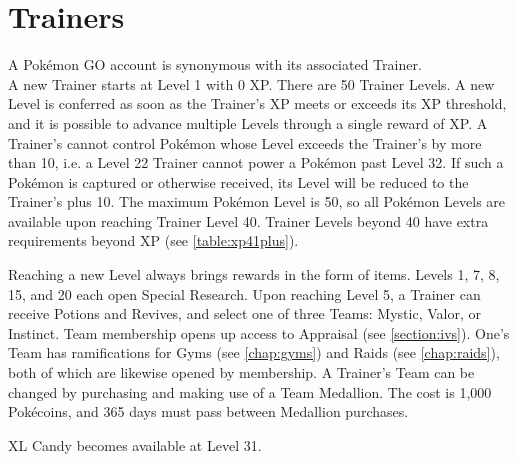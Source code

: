 \chapter{Trainers}
A Pokémon GO account is synonymous with its associated Trainer.\\

A new Trainer starts at Level 1 with 0 XP.
There are 50 Trainer Levels.
A new Level is conferred as soon as the Trainer's XP meets or exceeds
  its XP threshold, and it is possible to advance multiple Levels
  through a single reward of XP.
A Trainer's cannot control Pokémon whose Level exceeds the Trainer's by more than 10,
  i.e. a Level 22 Trainer cannot power a Pokémon past Level 32.
If such a Pokémon is captured or otherwise received, its Level will be
  reduced to the Trainer's plus 10.
The maximum Pokémon Level is 50, so all Pokémon Levels are available upon
  reaching Trainer Level 40.
Trainer Levels beyond 40 have extra requirements beyond XP (see \autoref{table:xp41plus}).

Reaching a new Level always brings rewards in the form of items.
Levels 1, 7, 8, 15, and 20 each open Special Research.
Upon reaching Level 5, a Trainer can receive Potions and Revives,
 and select one of three Teams: Mystic, Valor, or Instinct.
Team membership opens up access to Appraisal (see \autoref{section:ivs}).
One's Team has ramifications for Gyms (see \autoref{chap:gyms}) and Raids (see \autoref{chap:raids}),
  both of which are likewise opened by membership.
A Trainer's Team can be changed by purchasing and making use of a Team Medallion.
The cost is 1,000 Pokécoins, and 365 days must pass between Medallion purchases.

XL Candy becomes available at Level 31.

